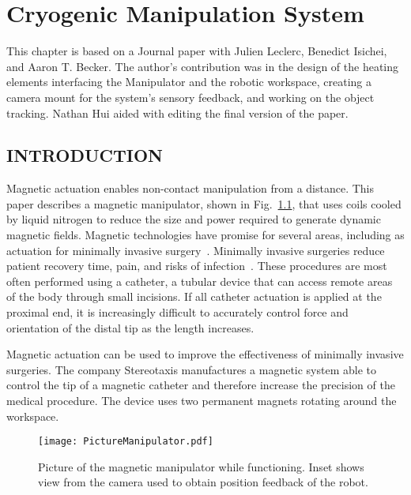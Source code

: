 



\chapter[Cryogenic Manipulation System]{Cryogenic Manipulation System}\label{chap-cryoMagnet}

This chapter is based on a Journal paper with Julien Leclerc, Benedict Isichei, and Aaron T. Becker.  The author's contribution was in the design of the heating elements interfacing the Manipulator and the robotic workspace, creating a camera mount for the system's sensory feedback, and working on the object tracking. 
Nathan Hui aided with editing the final version of the paper.


\section{INTRODUCTION}
Magnetic actuation enables non-contact manipulation from a distance.  
This paper describes a magnetic manipulator, shown in Fig.~\ref{MagneticManipulatorPic}, that uses coils cooled by liquid nitrogen to reduce the size and power required to generate dynamic magnetic fields. 
Magnetic technologies have promise for several areas, including as actuation for minimally invasive surgery~\cite{Stereoaxis,nelson2010microrobots}.
Minimally invasive surgeries reduce patient recovery time, pain, and risks of infection~\cite{robinson2004minimally}. 
 These procedures are most often performed using a catheter, a tubular device that can access remote areas of the body through small incisions. 
  If all catheter actuation is applied at the proximal end, it is increasingly difficult to accurately control force and orientation of the distal tip as the length increases. 

 Magnetic actuation can be used to improve the effectiveness of minimally invasive surgeries. 
 The company Stereotaxis \cite{Stereoaxis} manufactures a magnetic system able to control the tip of a magnetic catheter and therefore increase the precision of the medical procedure. 
 The device uses two permanent magnets rotating around the workspace.
 \begin{figure}
	\texttt{[image: PictureManipulator.pdf]}
	\caption{Picture of the magnetic manipulator while functioning. Inset shows view from the camera used to obtain position feedback of the robot.}
	\label{MagneticManipulatorPic}
\end{figure} 
 
